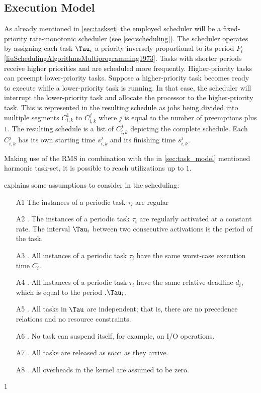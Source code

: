 \subsection{Execution Model}\label{sec:execution_model}
As already mentioned in \cref{sec:taskset} the employed scheduler will be a fixed-priority rate-monotonic scheduler (see \cref{sec:scheduling}).
The scheduler operates by assigning each task $\Tau_i$ a priority inversely proportional to its period $P_i$\ref{liuSchedulingAlgorithmsMultiprogramming1973}.
Tasks with shorter periods receive higher priorities and are scheduled more frequently.
Higher-priority tasks can preempt lower-priority tasks.
Suppose a higher-priority task becomes ready to execute while a lower-priority task is running. In that case, the scheduler will interrupt the lower-priority task and allocate the processor to the higher-priority task.
This is represented in the resulting schedule as jobs being divided into multiple segments $C_{i,k}^1$ to $C_{i,k}^j$ where $j$ is equal to the number of preemptions plus $1$.
The resulting schedule is a list of $C_{i,k}^j$ depicting the complete schedule.
Each $C_{i,k}^j$ has its own starting time $s_{i,k}^j$ and its finishing time $s_{i,k}^j$.

Making use of the \ac{RMS} in combination with the in \cref{sec:task_model} mentioned harmonic task-set, it is possible to reach utilizations up to $1$\cite{liuSchedulingAlgorithmsMultiprogramming1973}.

\textcite[p. 70f]{buttazzoHardRealTimeComputing2024} explains some assumptions to consider in the scheduling:
\begin{enumerate}
    \item[A1] The instances of a periodic task $\tau_i$ are regular
    \item[A2]. The instances of a periodic task $\tau_i$ are regularly activated at a constant rate. The interval $\Tau_i$ between two consecutive activations is the period of the task. 
    \item[A3]. All instances of a periodic task $\tau_i$ have the same worst-case execution time $C_i$.
    \item[A4]. All instances of a periodic task $\tau_i$ have the same relative deadline $d_i$, which is equal to the period .$\Tau_i$. 
    \item[A5]. All tasks in $\Tau$ are independent; that is, there are no precedence relations and no resource constraints.
    \item[A6]. No task can suspend itself, for example, on I/O operations. 
    \item[A7]. All tasks are released as soon as they arrive. 
    \item[A8]. All overheads in the kernel are assumed to be zero. 
\end{enumerate}
1

